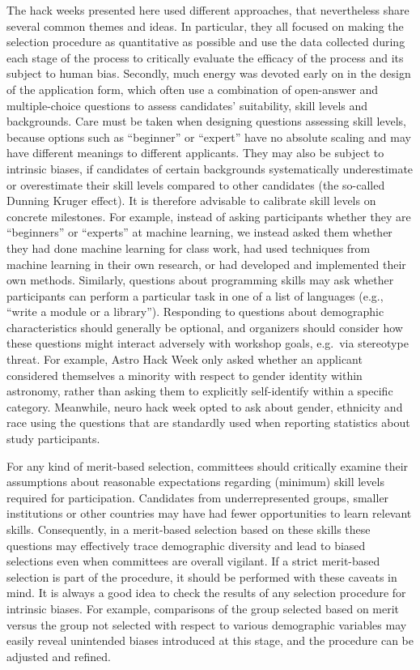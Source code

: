 \documentclass{aastex62}
\begin{document}
The hack weeks presented here used different approaches, that nevertheless share several common themes and ideas. In particular, they all focused on making the selection procedure as quantitative as possible and use the data collected during each stage of the process to critically evaluate the efficacy of the process and its subject to human bias.
Secondly, much energy was devoted early on in the design of the application form, which often use a combination of open-answer and multiple-choice questions to assess candidates' suitability, skill levels and backgrounds. Care must be taken when designing questions assessing skill levels, because options such as ``beginner'' or ``expert'' have no absolute scaling and may have different meanings to different applicants. They may also be subject to intrinsic biases, if candidates of certain backgrounds systematically underestimate or overestimate their skill levels compared to other candidates (the so-called Dunning Kruger effect). It is therefore advisable to calibrate skill levels on concrete milestones. For example, instead of asking participants whether they are ``beginners'' or ``experts'' at machine learning, we instead asked them whether they had done machine learning for class work, had used techniques from machine learning in their own research, or had developed and implemented their own methods. Similarly, questions about programming skills may ask whether participants can perform a particular task in one of a list of languages (e.g., ``write a module or a library'').
Responding to questions about demographic characteristics should generally be optional, and organizers should consider how these questions might interact adversely with workshop goals, e.g.\ via stereotype threat. For example, Astro Hack Week only asked whether an applicant considered themselves a minority with respect to gender identity within astronomy, rather than asking them to explicitly self-identify within a specific category. Meanwhile, neuro hack week opted to ask about gender, ethnicity and race using the questions that are standardly used when reporting statistics about study participants.

 For any kind of merit-based selection, committees should critically examine their assumptions about reasonable expectations regarding (minimum) skill levels required for participation. Candidates from underrepresented groups, smaller institutions or other countries may have had fewer opportunities to learn relevant skills. Consequently, in a merit-based selection based on these skills these questions may effectively trace demographic diversity and lead to biased selections even when committees are overall vigilant. If a strict merit-based selection is part of the procedure, it should be performed with these caveats in mind. It is always a good idea to check the results of any selection procedure for intrinsic biases. For example, comparisons of the group selected based on merit versus the group not selected with respect to various demographic variables may easily reveal unintended biases introduced at this stage, and the procedure can be adjusted and refined.
\end{document}
